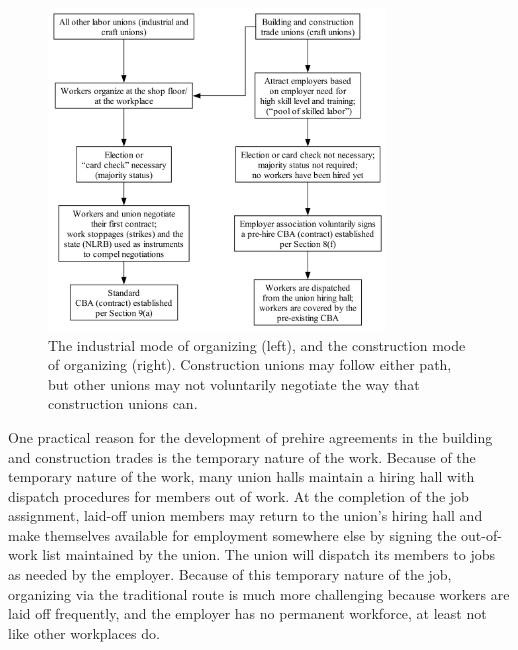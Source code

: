 \documentclass[12pt]{article}
\newcommand{\imageWidth}{0.8\textwidth}
\begin{document}
\begin{figure}[ht]
  \centering
  \includegraphics[width=\imageWidth]{images/organizing_paths}
  \captionsetup{justification=centering, singlelinecheck=false, margin=2cm}
  \caption[Union Organizing Paths]{The industrial mode of organizing (left), and the construction mode of organizing (right). Construction unions may follow either path, but other unions may not voluntarily negotiate the way that construction unions can.}
  \label{fig:organizing_paths}
\end{figure}

One practical reason for the development of prehire agreements in the building and construction trades is the temporary nature of the work. Because of the temporary nature of the work, many union halls maintain a hiring hall with dispatch procedures for members out of work. At the completion of the job assignment, laid-off union members may return to the union’s hiring hall and make themselves available for employment somewhere else by signing the out-of-work list maintained by the union. The union will dispatch its members to jobs as needed by the employer. Because of this temporary nature of the job, organizing via the traditional route is much more challenging because workers are laid off frequently, and the employer has no permanent workforce, at least not like other workplaces do. 
\end{document}
